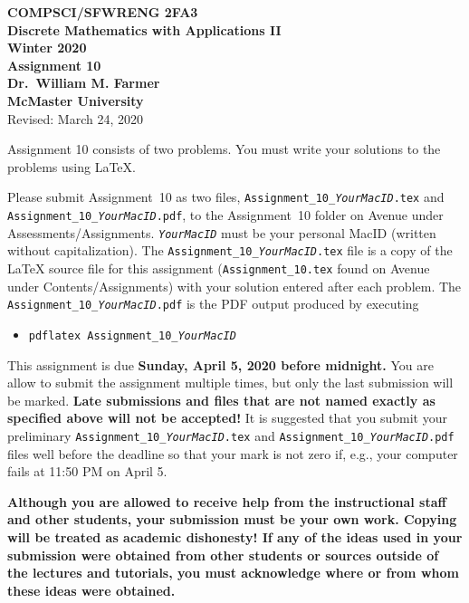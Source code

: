 \documentclass[11pt,fleqn]{article}
\begin{document}
\begin{center}

  {\large \textbf{COMPSCI/SFWRENG 2FA3}}\\[2mm]
  {\large \textbf{Discrete Mathematics with Applications II}}\\[2mm]
  {\large \textbf{Winter 2020}}\\[8mm]
  {\huge \textbf{Assignment 10}}\\[6mm]
  {\large \textbf{Dr.~William M. Farmer}}\\[2mm]
  {\large \textbf{McMaster University}}\\[6mm]
  {\large Revised: March 24, 2020}

\end{center}

\medskip

Assignment 10 consists of two problems.  You must write your solutions
to the problems using LaTeX.

Please submit Assignment~10 as two files,
\texttt{Assignment\_10\_\emph{YourMacID}.tex} and
\texttt{Assignment\_10\_\emph{YourMacID}.pdf}, to the Assignment~10
folder on Avenue under Assessments/Assignments.
\texttt{\emph{YourMacID}} must be your personal MacID (written without
capitalization).  The \texttt{Assignment\_10\_\emph{YourMacID}.tex}
file is a copy of the LaTeX source file for this assignment
(\texttt{Assignment\_10.tex} found on Avenue under
Contents/Assignments) with your solution entered after each problem.
The \texttt{Assignment\_10\_\emph{YourMacID}.pdf} is the PDF output
produced by executing

\begin{itemize}

  \item[] \texttt{pdflatex Assignment\_10\_\emph{YourMacID}}

\end{itemize}

This assignment is due \textbf{Sunday, April 5, 2020 before
  midnight.}  You are allow to submit the assignment multiple times,
but only the last submission will be marked.  \textbf{Late submissions
  and files that are not named exactly as specified above will not be
  accepted!}  It is suggested that you submit your preliminary
\texttt{Assignment\_10\_\emph{YourMacID}.tex} and
\texttt{Assignment\_10\_\emph{YourMacID}.pdf} files well before the
deadline so that your mark is not zero if, e.g., your computer fails
at 11:50 PM on April 5.

\textbf{Although you are allowed to receive help from the
  instructional staff and other students, your submission must be your
  own work.  Copying will be treated as academic dishonesty! If any of
  the ideas used in your submission were obtained from other students
  or sources outside of the lectures and tutorials, you must
  acknowledge where or from whom these ideas were obtained.}
\end{document}
